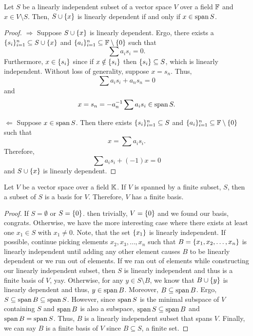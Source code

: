 \begin{thm}
	Let $S$ be a linearly independent subset of a vector space $V$ over a field $\mathbb{F}$ and $x\in V\setminus S$.
	Then, $S\cup\lbrace x \rbrace$ is linearly dependent if and only if $x\in\operatorname{span} S$.
\end{thm}
\begin{proof}
	$\Rightarrow$ Suppose $S\cup\lbrace x \rbrace$ is linearly dependent.
	Ergo, there exists a $\lbrace s_i \rbrace_{i=1}^n\subseteq S\cup\lbrace x \rbrace$ and $\lbrace a_i \rbrace_{i=1}^n\subseteq\mathbb{F}\setminus\lbrace 0 \rbrace$ such that
	\[
		\sum a_is_i=0.
	\]
	Furthermore, $x\in\lbrace s_i \rbrace$ since if $x\notin\lbrace s_i \rbrace$ then $\lbrace s_i \rbrace\subseteq S$, which is linearly independent.
	Without loss of generality, suppose $x=s_n$.
	Thus,
	\[
		\sum a_is_i +a_ns_n=0
	\]
	and
	\[
		x=s_n=-a_n^{-1}\sum a_is_i\in\operatorname{span} S.
	\]

	$\Leftarrow$ Suppose $x\in\operatorname{span} S$.
	Then there exists $\lbrace s_i \rbrace_{i=1}^n\subseteq S$ and $\lbrace a_i \rbrace_{i=1}^n\subseteq\mathbb{F}\setminus\lbrace 0 \rbrace$ such that
	\[
		x = \sum a_i s_i.
	\]
	Therefore,
	\[
		\sum a_i s_i + (-1)x=0
	\]
	and $S\cup\lbrace x \rbrace$ is linearly dependent.
\end{proof}

\begin{thm}
	Let $V$ be a vector space over a field $\mathbb{K}$.
	If $V$ is spanned by a finite subset, $S$, then a subset of $S$ is a basis for $V$.
	Therefore, $V$ has a finite basis.
\end{thm}
\begin{proof}
	If $S=\emptyset$ or $S=\lbrace 0 \rbrace$. then trivially, $V=\lbrace 0 \rbrace$ and we found our basis, congrats.
	Otherwise, we have the more interesting case where there exists at least one $x_1\in S$ with $x_1\neq0$.
	Note, that the set $\lbrace x_1 \rbrace$ is linearly independent.
	If possible, continue picking elements $x_2,x_3,\ldots,x_n$ such that $B=\lbrace x_1,x_2,\ldots,x_n \rbrace$ is linearly independent until adding any other element causes $B$ to be linearly dependent or we run out of elements.
	If we ran out of elements while constructing our linearly independent subset, then $S$ is linearly independent and thus is a finite basis of $V$, yay.
	Otherwise, for any $y\in S\setminus B$, we know that $B\cup\lbrace y \rbrace$ is linearly dependent and thus, $y\in\operatorname{span} B$.
	Moreover, $B\subseteq\operatorname{span} B$.
	Ergo, $S\subseteq \operatorname{span} B\subseteq\operatorname{span} S$.
	However, since $\operatorname{span} S$ is the minimal subspace of $V$ containing $S$ and $\operatorname{span} B$ is also a subspace, $\operatorname{span} S\subseteq\operatorname{span} B$ and $\operatorname{span} B=\operatorname{span} S$.
	Thus, $B$ is a linearly independent subset that spans $V$.
	Finally, we can say $B$ is a finite basis of $V$ since $B\subseteq S$, a finite set.
\end{proof}
